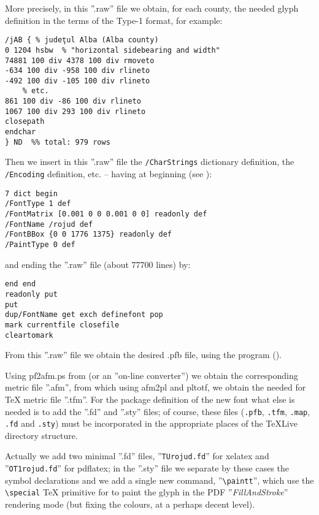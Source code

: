 \documentclass[a4paper,11pt]{article}
\begin{document}
More precisely, in this ''\textsf{.raw}'' file we obtain, for each county, the needed glyph definition in the terms of the Type-1 format, for example:

{\small  
\begin{verbatim}
/jAB { % judeţul Alba (Alba county)
0 1204 hsbw  % "horizontal sidebearing and width"
74881 100 div 4378 100 div rmoveto
-634 100 div -958 100 div rlineto
-492 100 div -105 100 div rlineto
    % etc.
861 100 div -86 100 div rlineto
1067 100 div 293 100 div rlineto
closepath
endchar
} ND  %% total: 979 rows
\end{verbatim}
}

Then we insert in this ''\textsf{.raw}'' file the \texttt{/CharStrings} dictionary definition, the \texttt{/Encoding} definition, etc. -- having at beginning {\small(see \cite{PLRM})}:

{\small
\begin{verbatim}
7 dict begin
/FontType 1 def
/FontMatrix [0.001 0 0 0.001 0 0] readonly def
/FontName /rojud def
/FontBBox {0 0 1776 1375} readonly def
/PaintType 0 def
\end{verbatim}
}

and ending the ''\textsf{.raw}'' file {\small(about 77700 lines)} by:

{\small
\begin{verbatim}
end end
readonly put
put
dup/FontName get exch definefont pop
mark currentfile closefile
cleartomark
\end{verbatim}
}

From this ''\textsf{.raw}'' file we obtain the desired \textsf{.pfb} file, using the  program (\cite{t1asm}).

\smallskip
Using \textsf{pf2afm.ps} from \cite{GS} {\small(or an ''on-line converter'')} we obtain the corresponding metric file ''\textsf{.afm}'', from which using \textsf{afm2pl} and \textsf{pltotf}, we obtain the needed for TeX metric file ''\textsf{.tfm}''. For the package definition of the new font what else is needed is to add the ''\textsf{.fd}'' and ''\textsf{.sty}'' files; of course, these files {\small(\texttt{.pfb}, \texttt{.tfm}, \texttt{.map}, \texttt{.fd} and \texttt{.sty})} must be incorporated in the appropriate places of the TeXLive directory structure.

\smallskip
Actually we add two minimal ''\textsf{.fd}'' files, ''\texttt{TUrojud.fd}'' for \textsf{xelatex} and ''\texttt{OT1rojud.fd}'' for \textsf{pdflatex}; in the ''\textsf{.sty}'' file we separate by these cases the symbol declarations and we add a single new command, ''\texttt{\textbackslash{}paintt}'', which use the \texttt{\textbackslash{}special} TeX primitive for to paint the glyph in the PDF ''\emph{FillAndStroke}'' rendering mode {\small(but fixing the colours, at a perhaps decent level)}.
\end{document}
